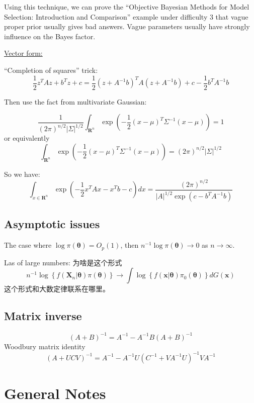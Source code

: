 \documentclass[
]{book}
\theoremstyle{definition}
\theoremstyle{definition}
\theoremstyle{definition}
\theoremstyle{remark}
\begin{document}
Using this technique, we can prove the ``Objective Bayesian Methods for Model Selection: Introduction and Comparison'' example under difficulty 3 that vague proper prior usually gives bad answers. Vague parameters usually have strongly influence on the Bayes factor.

\href{http://cs229.stanford.edu/section/more_on_gaussians.pdf}{Vector form:}

``Completion of squares'' trick:
\[
\frac{1}{2} z^{T} A z+b^{T} z+c=\frac{1}{2}\left(z+A^{-1} b\right)^{T} A\left(z+A^{-1} b\right)+c-\frac{1}{2} b^{T} A^{-1} b
\]

Then use the fact from multivariate Gaussian:

\[
\frac{1}{(2 \pi)^{n / 2}|\Sigma|^{1 / 2}} \int_{\mathbf{R}^{n}} \exp \left(-\frac{1}{2}(x-\mu)^{T} \Sigma^{-1}(x-\mu)\right)=1
\]
or equivalently
\[
\int_{\mathbf{R}^{n}} \exp \left(-\frac{1}{2}(x-\mu)^{T} \Sigma^{-1}(x-\mu)\right)=(2 \pi)^{n / 2}|\Sigma|^{1 / 2}
\]

So we have:
\[
\int_{x \in \mathbf{R}^{n}} \exp \left(-\frac{1}{2} x^{T} A x-x^{T} b-c\right) d x=\frac{(2 \pi)^{n / 2}}{|A|^{1 / 2} \exp \left(c-b^{T} A^{-1} b\right)}
\]

\hypertarget{asymptotic-issues}{%
\section{Asymptotic issues}\label{asymptotic-issues}}

The case where \(\log \pi(\boldsymbol{\theta})=O_{p}(1)\), then \(n^{-1} \log \pi(\boldsymbol{\theta}) \rightarrow 0\) as \(n\rightarrow \infty\).

Las of large numbers: 为啥是这个形式
\[
n^{-1} \log \left\{f\left(\boldsymbol{X}_{n} | \boldsymbol{\theta}\right) \pi(\boldsymbol{\theta})\right\} \rightarrow \int \log \left\{f(\boldsymbol{x} | \boldsymbol{\theta}) \pi_{0}(\boldsymbol{\theta})\right\} d G(\boldsymbol{x})
\]
这个形式和大数定律联系在哪里。

\hypertarget{matrix-inverse}{%
\section{Matrix inverse}\label{matrix-inverse}}

\[
(A+B)^{-1}=A^{-1}-A^{-1} B(A+B)^{-1}
\]
Woodbury matrix identity
\[
(A+U C V)^{-1}=A^{-1}-A^{-1} U\left(C^{-1}+V A^{-1} U\right)^{-1} V A^{-1}
\]

\hypertarget{general-notes}{%
\chapter{General Notes}\label{general-notes}}
\end{document}

